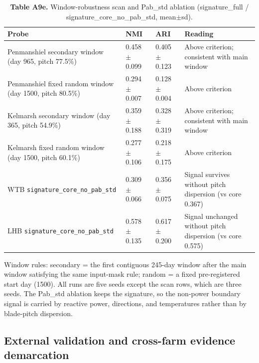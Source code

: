 \documentclass[
  journal]{IEEEtran}
\begin{document}
\begin{table}[!t]
\centering
\fontsize{8.0pt}{9.6pt}\selectfont
\setlength{\tabcolsep}{2.4pt}
\renewcommand{\arraystretch}{1.05}
\caption*{\textbf{Table A9e.} Window-robustness scan and Pab\_std ablation (signature\_full / signature\_core\_no\_pab\_std, mean$\pm$sd).}
%
\begin{tabular}{llll}
\toprule
Probe & NMI & ARI & Reading \\
\midrule
Penmanshiel secondary window (day 965, pitch 77.5\%) & 0.458 $\pm$ 0.099 & 0.405 $\pm$ 0.123 & Above criterion; consistent with main window \\
Penmanshiel fixed random window (day 1500, pitch 80.5\%) & 0.294 $\pm$ 0.007 & 0.128 $\pm$ 0.004 & Above criterion \\
Kelmarsh secondary window (day 365, pitch 54.9\%) & 0.359 $\pm$ 0.188 & 0.328 $\pm$ 0.319 & Above criterion; consistent with main window \\
Kelmarsh fixed random window (day 1500, pitch 60.1\%) & 0.277 $\pm$ 0.106 & 0.218 $\pm$ 0.175 & Above criterion \\
\midrule
WTB \texttt{signature\_core\_no\_pab\_std} & 0.309 $\pm$ 0.066 & 0.356 $\pm$ 0.075 & Signal survives without pitch dispersion (vs core 0.367) \\
LHB \texttt{signature\_core\_no\_pab\_std} & 0.578 $\pm$ 0.135 & 0.617 $\pm$ 0.200 & Signal unchanged without pitch dispersion (vs core 0.575) \\
\bottomrule
\end{tabular}
\vspace{1mm}
\fontsize{8.0pt}{9.6pt}\selectfont Window rules: secondary = the first contiguous 245-day window after the main window satisfying the same input-mask rule; random = a fixed pre-registered start day (1500). All runs are five seeds except the scan rows, which are three seeds. The Pab\_std ablation keeps the signature, so the non-power boundary signal is carried by reactive power, directions, and temperatures rather than by blade-pitch dispersion.
\end{table}

\FloatBarrier

\subsection*{External validation and cross-farm evidence
demarcation}\label{external-validation-and-cross-farm-evidence-demarcation}
\end{document}
